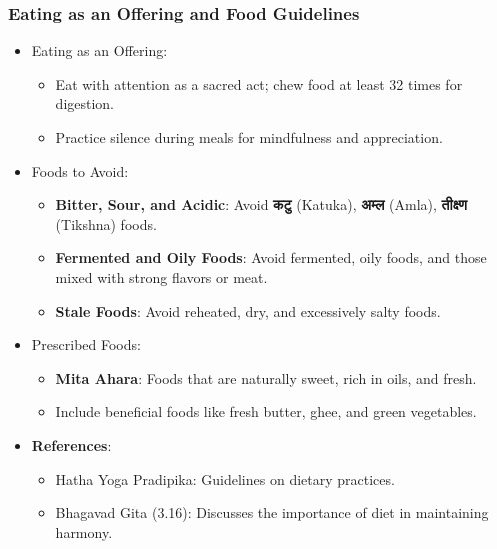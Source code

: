 \begin{frame}[fragile]\frametitle{Eating as an Offering and Food Guidelines}

\begin{itemize}
    \item Eating as an Offering: 
        \begin{itemize}
            \item Eat with attention as a sacred act; chew food at least 32 times for digestion.
            \item Practice silence during meals for mindfulness and appreciation.
        \end{itemize}
    \item Foods to Avoid:
        \begin{itemize}
            \item \textbf{Bitter, Sour, and Acidic}: Avoid \textbf{कटु} (Katuka), \textbf{अम्ल} (Amla), \textbf{तीक्ष्ण} (Tikshna) foods.
            \item \textbf{Fermented and Oily Foods}: Avoid fermented, oily foods, and those mixed with strong flavors or meat.
            \item \textbf{Stale Foods}: Avoid reheated, dry, and excessively salty foods.
        \end{itemize}
    \item Prescribed Foods:
        \begin{itemize}
            \item \textbf{Mita Ahara}: Foods that are naturally sweet, rich in oils, and fresh.
            \item Include beneficial foods like fresh butter, ghee, and green vegetables.
        \end{itemize}
\end{itemize}
\begin{itemize}
    \item \textbf{References}:
        \begin{itemize}
            \item Hatha Yoga Pradipika: Guidelines on dietary practices.
            \item Bhagavad Gita (3.16): Discusses the importance of diet in maintaining harmony.
        \end{itemize}
\end{itemize}

\end{frame}

